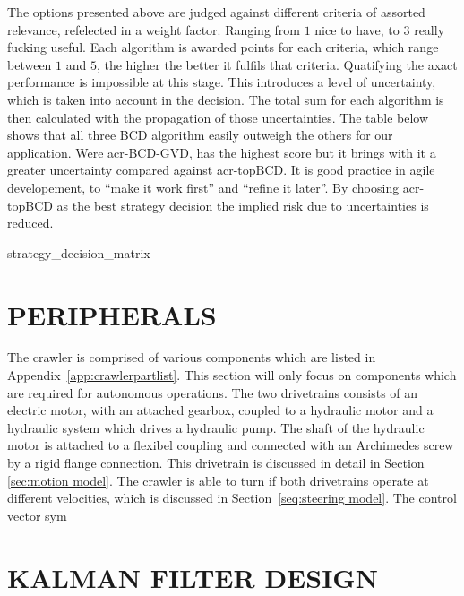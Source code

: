 The options presented above are judged against different criteria of assorted relevance, refelected in a weight factor.
Ranging from \( 1 \) nice to have, to \(  3 \) really fucking useful. Each algorithm is awarded points for each
criteria, which range between \( 1 \) and \( 5 \), the higher the better it fulfils that criteria. Quatifying the axact
performance is impossible at this stage. This introduces a level of uncertainty, which is taken into account in the
decision. The total sum for each algorithm is then calculated with the propagation of those uncertainties. The table
below shows that all three BCD algorithm easily outweigh the others for our application. Were \gls{acr-BCD-GVD}, has the
highest score but it brings with it a greater uncertainty compared against \gls{acr-topBCD}. It is good practice in
agile developement, to ``make it work first'' and ``refine it later''. By choosing \gls{acr-topBCD} as the best strategy
decision the implied risk due to uncertainties is reduced.

{strategy_decision_matrix}

\section{PERIPHERALS}\label{sec:peripherals}

The crawler is comprised of various components which are listed in Appendix~\ref{app:crawlerpartlist}. This section will
only focus on components which are required for autonomous operations. The two drivetrains consists of an electric
motor, with an attached gearbox, coupled to a hydraulic motor and a hydraulic system which drives a hydraulic pump. The
shaft of the hydraulic motor is attached to a flexibel coupling and connected with an Archimedes screw by a rigid flange
connection. This drivetrain is discussed in detail in Section \ref{sec:motion model}. The crawler is able to turn if both drivetrains operate at different velocities, which is discussed in Section~\ref{seq:steering model}. The control vector \gls{sym}




\section{KALMAN FILTER DESIGN}\label{sec:kalman design}

